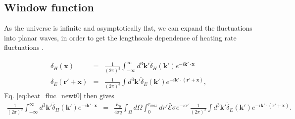 \documentclass[twocolumns]{emulateapj}
\begin{document}
\subsection{Window function}
As the universe is infinite and asymptotically flat, we can expand the fluctuations into planar waves, in order to get the lengthscale dependence of heating rate fluctuations \citep{2004MNRAS.352..142B}.

\begin{eqnarray}
  \label{eq:FT_delta}
  \delta_H(\mathbf{x})&=&\frac{1}{(2\pi)^3}\int_{-\infty}^{\infty} d^3\mathbf{k'} \tilde{\delta}_H(\mathbf{k'}) e^{-i\mathbf{k'}\cdot\mathbf{x}}\\ \nonumber
  \delta_E(\mathbf{r}'+\mathbf{x})&=&\frac{1}{(2\pi)^3}\int d^3\mathbf{k'} \tilde{\delta}_E(\mathbf{k'}) e^{-i\mathbf{k'}\cdot(\mathbf{r'}+\mathbf{x})},
\end{eqnarray}
Eq. \ref{eq:heat_fluc_newt0} then gives
\begin{eqnarray}
  \label{eq:heat_fluc_newt1}
\frac{1}{(2\pi)^3}\int_{-\infty}^{\infty} d^3\mathbf{k'} \tilde{\delta}_H(\mathbf{k'}) e^{-i\mathbf{k'}\cdot\mathbf{x}}&=&\frac{E_0}{4\pi\bar{\dot{q}}} \int_{\Omega}d\Omega\int_0^{r_{max}}  dr' \bar{\mathcal{E}}\sigma  e^{-\kappa r'}  \frac{1}{(2\pi)^3}\int d^3\mathbf{k'} \tilde{\delta}_E(\mathbf{k'}) e^{-i\mathbf{k'}\cdot(\mathbf{r'}+\mathbf{x})}.
\end{eqnarray}

\end{document}
